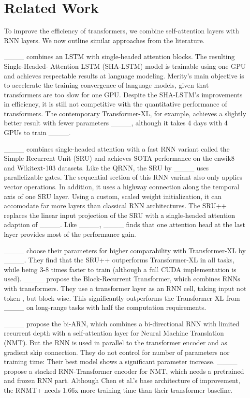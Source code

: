 \section{Related Work}
\label{sec:related_work}
To improve the efficiency of transformers, we combine self-attention
layers with RNN layers.  We now outline similar approaches from the
literature.

____ combines an LSTM with single-headed attention
blocks. The resulting Single-Headed-
Attention LSTM (SHA-LSTM) model is trainable using one GPU and
achieves respectable results at language modeling. Merity's main
objective is to accelerate the training convergence of language
models, given that transformers are too slow for one GPU.  Despite the
SHA-LSTM's improvements in efficiency, it is still not competitive
with the quantitative performance of transformers. The contemporary
Transformer-XL, for example, achieves a slightly better result with
fewer parameters ____, although it takes
4 days with 4 GPUs to train ____.

____ combines single-headed attention with a fast RNN
variant called the Simple Recurrent Unit (SRU) and achieves SOTA
performance on the enwik8 and Wikitext-103 datasets. Like the QRNN,
the SRU by ____ uses parallelizable gates. The
sequential section of this RNN variant also only applies vector
operations. In addition, it uses a highway connection along the temporal axis of one SRU
layer. Using a custom, scaled weight initialization,
it can accomodate far more layers than classical RNN architectures. The
SRU++ replaces the linear input projection of the SRU with a
single-headed attention adaption of ____. Like
____, ____ finds that one
attention head at the last layer provides most of the performance
gain.

____ choose their parameters for higher
comparability with Transformer-XL by
____.  They find that the SRU++
outperforms Transformer-XL in all tasks, while being 3-8 times faster
to train (although a full CUDA implementation is used).
____ propose the Block-Recurrent Transformer,
which combines RNNs with transformers. They use a
transformer layer as an RNN cell, taking input not token-, but
block-wise. This significantly outperforms the Transformer-XL from
____ on long-range tasks with half the
computation requirements.

____ propose the bi-ARN, which combines a bi-directional RNN with limited recurrent depth with a self-attention layer for Neural Machine Translation (NMT). But the RNN is used in parallel to the transformer encoder and as gradient skip connection. They do not control for number of parameters nor training time: Their best model shows a significant parameter increase.
____ propose a stacked RNN-Transformer encoder for NMT, which needs a pretrained and frozen RNN part. Although Chen et al.’s base architecture of improvement, the RNMT+ needs 1.66x more training time than their transformer baseline.

